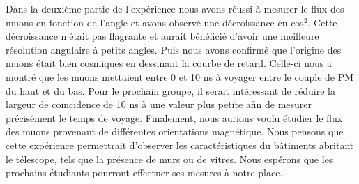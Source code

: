 \documentclass[12pt]{article}
\begin{document}
Dans la deuxième partie de l'expérience nous avons réussi à mesurer le flux des muons en fonction de l'angle et avons observé une décroissance en $\text{cos}^2$. Cette décroissance n'était pas flagrante et aurait bénéficié d'avoir une meilleure résolution angulaire à petits angles. Puis nous avons confirmé que l'origine des muons était bien cosmiques en dessinant la courbe de retard. Celle-ci nous a montré que les muons mettaient entre 0 et 10 ns à voyager entre le couple de PM du haut et du bas. Pour le prochain groupe, il serait intéressant de réduire la largeur de coïncidence de 10 ns à une valeur plus petite  afin de mesurer précisément le temps de voyage. Finalement, nous aurions voulu étudier le flux des muons provenant de différentes orientations magnétique. Nous pensons que cette expérience permettrait d'observer les caractéristiques du bâtiments abritant le télescope, tels que la présence de murs ou de vitres. Nous espérons que les prochains étudiants pourront effectuer ses mesures à notre place.




\newpage{}


\end{document}
